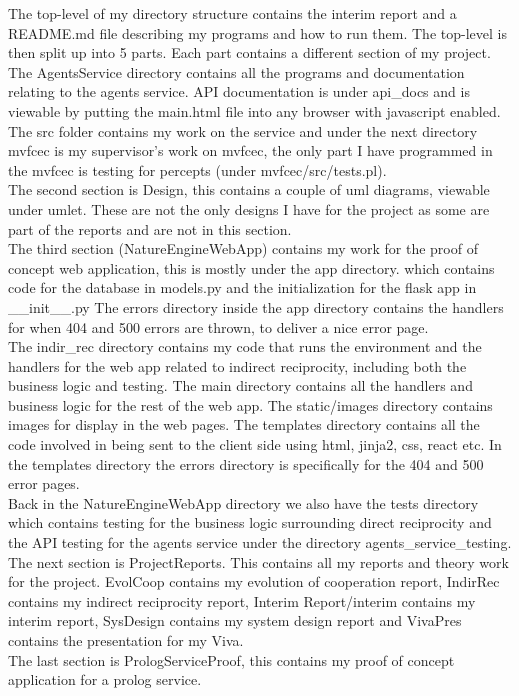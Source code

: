 \documentclass[]{final_report}
\begin{document}
The top-level of my directory structure contains the interim report and a README.md file describing my programs and how to run them. The top-level is then split up into 5 parts. Each part contains a different section of my project. The AgentsService directory contains all the programs and documentation relating to the agents service. API documentation is under api\_docs and is viewable by putting the main.html file into any browser with javascript enabled. The src folder contains my work on the service and under the next directory mvfcec is my supervisor's work on mvfcec, the only part I have programmed in the mvfcec is testing for percepts (under mvfcec/src/tests.pl).\\
The second section is Design, this contains a couple of uml diagrams, viewable under umlet. These are not the only designs I have for the project as some are part of the reports and are not in this section.\\
The third section (NatureEngineWebApp) contains my work for the proof of concept web application, this is mostly under the app directory. which contains code for the database in models.py and the initialization for the flask app in \_\_init\_\_.py The errors directory inside the app directory contains the handlers for when 404 and 500 errors are thrown, to deliver a nice error page.\\
The indir\_rec directory contains my code that runs the environment and the handlers for the web app related to indirect reciprocity, including both the business logic and testing. The main directory contains all the handlers and business logic for the rest of the web app. The static/images directory contains images for display in the web pages. The templates directory contains all the code involved in being sent to the client side using html, jinja2, css, react etc. In the templates directory the errors directory is specifically for the 404 and 500 error pages.\\
Back in the NatureEngineWebApp directory we also have the tests directory which contains testing for the business logic surrounding direct reciprocity and the API testing for the agents service under the directory agents\_service\_testing.\\
The next section is ProjectReports. This contains all my reports and theory work for the project. EvolCoop contains my evolution of cooperation report, IndirRec contains my indirect reciprocity report, Interim Report/interim contains my interim report, SysDesign contains my system design report and VivaPres contains the presentation for my Viva.\\
The last section is PrologServiceProof, this contains my proof of concept application for a prolog service. 









\end{document}
